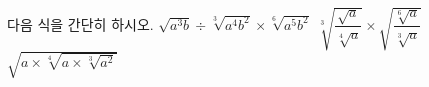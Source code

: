 다음 식을 간단히 하시오. 
 $\sqrt{a^3b}\div\sqrt[3]{a^4b^2}\times\sqrt[6]{a^5b^2}$
 $\sqrt[3]{\dfrac{\sqrt{a}}{\sqrt[4]{a}}}\times\sqrt{\dfrac{\sqrt[6]{a}}{\sqrt[3]{a}}}$
 $\sqrt{a\times\sqrt[4]{a\times\sqrt[3]{a^2}}}$

